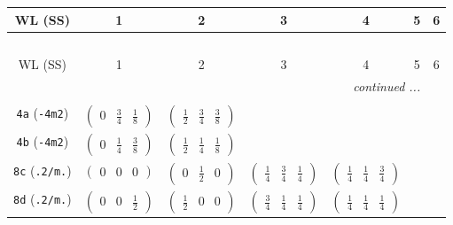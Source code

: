 \documentclass[fleqn,9pt,landscape]{jsarticle}
\begin{document}
\begin{center}
\renewcommand{\arraystretch}{1.2}
\begin{longtable}{ccccccc}
 \hline \hline
WL (SS) & 1 & 2 & 3 & 4 & 5 & 6 \\ \hline \endfirsthead

\multicolumn{6}{l}{\tablename\ \thetable{}} \\
 \hline \hline
WL (SS) & 1 & 2 & 3 & 4 & 5 & 6 \\ \hline \endhead

 \hline \hline
\multicolumn{6}{r}{\footnotesize\it continued ...} \\ \endfoot

 \hline \hline
\multicolumn{6}{r}{} \\ \endlastfoot

{\tt 4a} ({\tt -4m2}) & $ \begin{pmatrix} 0 & \frac{3}{4} & \frac{1}{8} \end{pmatrix} $ & $ \begin{pmatrix} \frac{1}{2} & \frac{3}{4} & \frac{3}{8} \end{pmatrix} $ & $  $ & $  $ & $  $ & $  $ \\ \hline
{\tt 4b} ({\tt -4m2}) & $ \begin{pmatrix} 0 & \frac{1}{4} & \frac{3}{8} \end{pmatrix} $ & $ \begin{pmatrix} \frac{1}{2} & \frac{1}{4} & \frac{1}{8} \end{pmatrix} $ & $  $ & $  $ & $  $ & $  $ \\ \hline
{\tt 8c} ({\tt .2/m.}) & $ \begin{pmatrix} 0 & 0 & 0 \end{pmatrix} $ & $ \begin{pmatrix} 0 & \frac{1}{2} & 0 \end{pmatrix} $ & $ \begin{pmatrix} \frac{1}{4} & \frac{3}{4} & \frac{1}{4} \end{pmatrix} $ & $ \begin{pmatrix} \frac{1}{4} & \frac{1}{4} & \frac{3}{4} \end{pmatrix} $ & $  $ & $  $ \\ \hline
{\tt 8d} ({\tt .2/m.}) & $ \begin{pmatrix} 0 & 0 & \frac{1}{2} \end{pmatrix} $ & $ \begin{pmatrix} \frac{1}{2} & 0 & 0 \end{pmatrix} $ & $ \begin{pmatrix} \frac{3}{4} & \frac{1}{4} & \frac{1}{4} \end{pmatrix} $ & $ \begin{pmatrix} \frac{1}{4} & \frac{1}{4} & \frac{1}{4} \end{pmatrix} $ & $  $ & $  $ \\ \hline

\end{longtable}
\end{center}
\end{document}
